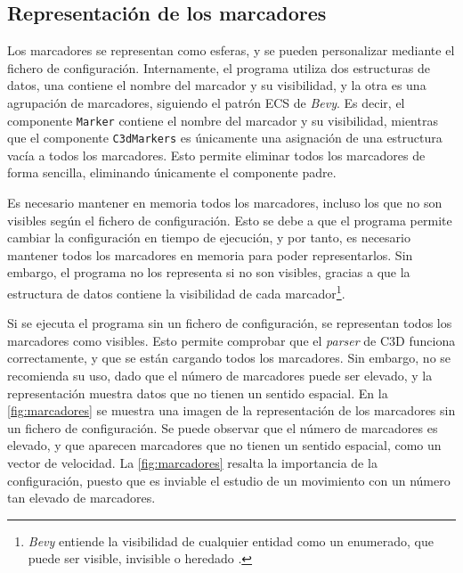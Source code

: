 \subsection{Representación de los marcadores} \label{sec:representacion-marcadores}

Los marcadores se representan como esferas, y se pueden personalizar mediante el fichero de configuración. Internamente, el programa utiliza dos estructuras de datos, una contiene el nombre del marcador y su visibilidad, y la otra es una agrupación de marcadores, siguiendo el patrón \ac{ECS} de \textit{Bevy}. Es decir, el componente \texttt{Marker} contiene el nombre del marcador y su visibilidad, mientras que el componente \texttt{C3dMarkers} es únicamente una asignación de una estructura vacía a todos los marcadores. Esto permite eliminar todos los marcadores de forma sencilla, eliminando únicamente el componente padre.

Es necesario mantener en memoria todos los marcadores, incluso los que no son visibles según el fichero de configuración. Esto se debe a que el programa permite cambiar la configuración en tiempo de ejecución, y por tanto, es necesario mantener todos los marcadores en memoria para poder representarlos. Sin embargo, el programa no los representa si no son visibles, gracias a que la estructura de datos contiene la visibilidad de cada marcador\footnote{\textit{Bevy} entiende la visibilidad de cualquier entidad como un enumerado, que puede ser visible, invisible o heredado \autocite{VisibilityBevyRender}.}.

Si se ejecuta el programa sin un fichero de configuración, se representan todos los marcadores como visibles. Esto permite comprobar que el \textit{parser} de \ac{C3D} funciona correctamente, y que se están cargando todos los marcadores. Sin embargo, no se recomienda su uso, dado que el número de marcadores puede ser elevado, y la representación muestra datos que no tienen un sentido espacial. En la \autoref{fig:marcadores} se muestra una imagen de la representación de los marcadores sin un fichero de configuración. Se puede observar que el número de marcadores es elevado, y que aparecen marcadores que no tienen un sentido espacial, como un vector de velocidad. La \autoref{fig:marcadores} resalta la importancia de la configuración, puesto que es inviable el estudio de un movimiento con un número tan elevado de marcadores. 

